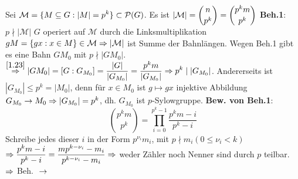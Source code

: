 \documentclass[a4paper,10pt,german]{scrbook}
\theoremstyle{saetze}
\theoremstyle{definitionen}
\begin{document}
    {
        \item Sei $\displaystyle\mathcal{M} = \{ M \subseteq G: |M| = p^k\} \subset 
        \mathcal{P}(G)$. \newline Es ist $\displaystyle|\mathcal{M}| = \binom{n}{p^k} = \binom{p^k
        m}{p^k}$ \newline
        \textbf{Beh.1}:
            $p \nmid |\mathcal{M}|$ \newline
        $G$ operiert auf $\mathcal{M}$ durch die Linksmultiplikation $gM = 
        \{ gx : x \in M\} \in \mathcal{M} \Rightarrow |\mathcal{M}|$ ist 
        Summe der Bahnlängen. Wegen Beh.1 gibt es eine Bahn $G M_0$ mit $p \nmid
        |G M_0|$. \newline $\displaystyle \overset{\ref{1.23}}{\Rightarrow} |G M_0|
        =[G:G_{M_0}] = \frac{|G|}{|G_{M_0}|} = \frac{p^km}{|G_{M_0}|} \Rightarrow p^k \mid |G_{M_0}|$.\newline
        Andererseits ist $|G_{M_0}| \leq p^k = |M_0|$, denn für $x \in M_0$ ist
        $g\mapsto gx$ injektive Abbildung $G_{M_0} \rightarrow M_0 \Rightarrow |G_{M_0}| = p^k$,
        dh. $G_{M_0}$ ist $p$-Sylowgruppe. \newline
        \textbf{Bew. von Beh.1}:
            \[ \binom{p^k m}{p^k} = \prod_{i=0}^{p^k-1} \frac{p^k m - i}{p^k
            -i}\] Schreibe jedes dieser $i$ in der Form $p^{\nu_i} m_i$, mit $p
            \nmid m_i (0\leq \nu_i < k)$ $\displaystyle \Rightarrow \frac{p^k m - i}{p^k
            - i} = \frac{m p^{k-\nu_i} - m_i}{p^{k-\nu_i} - m_i} \Rightarrow$ weder
            Zähler noch Nenner sind durch $p$ teilbar. $\Rightarrow$ Beh. $\\\rightarrow$

}
\end{document}

